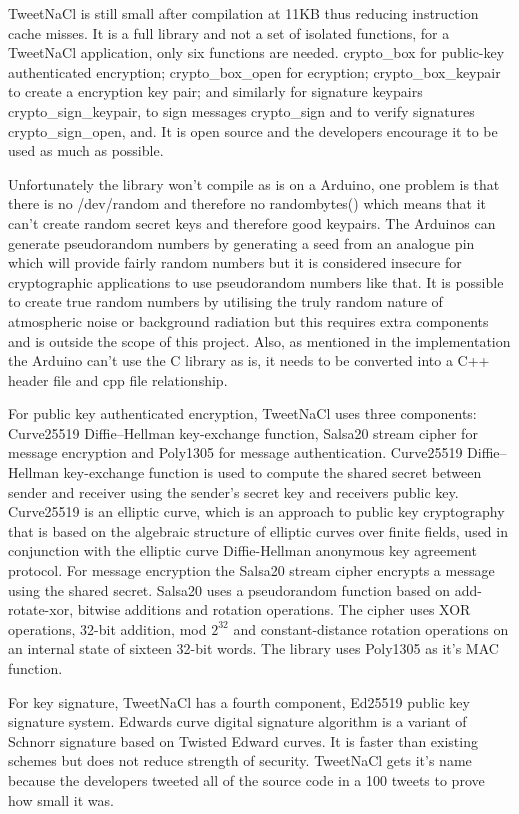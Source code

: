 TweetNaCl is still small after compilation at 11KB thus reducing instruction cache misses. It is a full library and not a set of isolated functions, for a TweetNaCl application, only six functions are needed. crypto\_box for public-key authenticated encryption; crypto\_box\_open for ecryption; crypto\_box\_keypair to create a encryption key pair; and similarly for signature keypairs crypto\_sign\_keypair, to sign messages crypto\_sign and to verify signatures crypto\_sign\_open, and. It is open source and the developers encourage it to be used as much as possible. 

Unfortunately the library won't compile as is on a Arduino, one problem is that there is no /dev/random and therefore no randombytes() which means that it can't create random secret keys and therefore good keypairs. The Arduinos can generate pseudorandom numbers by generating a seed from an analogue pin which will provide fairly random numbers but it is considered insecure for cryptographic applications to use pseudorandom numbers like that\cite{arduinopseudo}. It is possible to create true random numbers by utilising the truly random nature of atmospheric noise or background radiation but this requires extra components and is outside the scope of this project. Also, as mentioned in the implementation the Arduino can't use the C library as is, it needs to be converted into a C++ header file and cpp file relationship.

For public key authenticated encryption, TweetNaCl uses three components: Curve25519 Diffie–Hellman key-exchange function, Salsa20 stream cipher for message encryption and Poly1305 for message authentication. Curve25519 Diffie–Hellman key-exchange function is used to compute the shared secret between sender and receiver using the sender's secret key and receivers public key. Curve25519 is an elliptic curve, which is an approach to public key cryptography that is based on the algebraic structure of elliptic curves over finite fields, used in conjunction with the elliptic curve Diffie-Hellman anonymous key agreement protocol\cite{curve}. For message encryption the Salsa20 stream cipher encrypts a message using the shared secret. Salsa20 uses a pseudorandom function based on add-rotate-xor, bitwise additions and rotation operations. The cipher uses XOR operations, 32-bit addition, mod $2^{32}$ and constant-distance rotation operations on an internal state of sixteen 32-bit words\cite{salsa}. The library uses Poly1305 as it's MAC function\cite{poly}.

For key signature, TweetNaCl has a fourth component, Ed25519 public key signature system. Edwards curve digital signature algorithm is a variant of Schnorr signature based on Twisted Edward curves. It is faster than existing schemes but does not reduce strength of security\cite{ed25}. TweetNaCl gets it's name because the developers tweeted all of the source code in a 100 tweets to prove how small it was.

